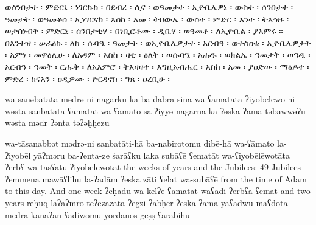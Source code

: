 
\begin{ethiopictext}
    ወሰንበታተ ፡ ምድርኒ ፡ ነገርኩከ ፡ በደብረ ፡ ሲና ፡ ወዓመታተ ፡
    ኢዮቤሌዎኒ ፡ ውስተ ፡ ሰንበታተ ፡ ዓመታት ፡ ወዓመቶሰ ፡ ኢነገርናከ ፡
    እስከ ፡ አመ ፡ ትበውኡ ፡ ውስተ ፡ ምድር ፡ እንተ ፡ ትእኅዙ ፡
    ወታሰነብት ፡ ምድርኒ ፡ ሰንበታቲሃ ፡ በነቢሮቶሙ ፡ ዲቤሃ ፡ 
    ወዓመቶ ፡ ለኢዮቤል ፡ ያእምሩ ። 
    በእንተዝ ፡ ሠራዕኩ ፡ ለከ ፡ 
    ሱባዔ ፡ ዓመታት ፡ ወኢዮቤሌዎታተ ፡ አርብዓ ፡ ወተስዐቱ ፡ ኢዮቤሌዎታት ፡
    አምነ ፡ መዋዕሊሁ ፡ ለአዳም ፡ እስከ ፡ ዛቲ ፡ ዕለት ፡ ወሱባዔ ፡
    አሐዱ ፡ ወክልኤ ፡ ዓመታት ፡ ወዓዲ ፡ አርብዓ ፡ ዓመት ፡ 
    ርሑቅ ፡ ለአእምሮ ፡ ትእዛዛተ ፡ እግዚአብሔር ፡ እስከ ፡ አመ ፡ ያዐድው ፡
    ማዕዶተ ፡ ምድረ ፡ ከናአን ፡ ዐዲዎሙ ፡ ዮርዳኖስ ፡ ግጸ ፡ ዐረቢሁ ፡
\end{ethiopictext}
\begin{transliteration}
    wa-sanəbatāta mədrə-ni nagarku-ka ba-dabra sinā wa-ʕāmatāta
    ʔiyobēlēwo-ni wəsta sanbatāta ʕāmatāt wa-ʕāmato-sa ʔiyyə-nagarnā-ka
    ʔəska ʔama təbawwəʔu wəsta mədr ʔənta təʔəḫḫezu

    wa-tāsanabbət mədrə-ni sanbatāti-hā ba-nabirotomu dibē-hā
    wa-ʕāmato la-ʔiyobēl yāʔməru
    ba-ʔenta-ze śarāʕku laka
    subāʕē ʕematāt wa-ʕiyobēlēwotāta ʔerbʕ wa-tasʕatu ʔiyobēlēwotāt
    the weeks of years and the Jubilees: 49 Jubilees
    ʔemmena mawāʕlihu la-ʔadām ʔeska zāti ʕelat wa-subāʕē
    from the time of Adam to this day. And one week
    ʔeḥadu wa-kelʔē ʕāmatāt waʕādi ʔerbʕā ʕemat
    and two years
    reḥuq laʔaʔmro teʔezāzāta ʔegzi-ʔabḥēr ʔeska ʔama yaʕadwu
    māʕdota medra kanāʔan ʕadiwomu yordānos geṣṣ ʕarabihu

\end{transliteration}

